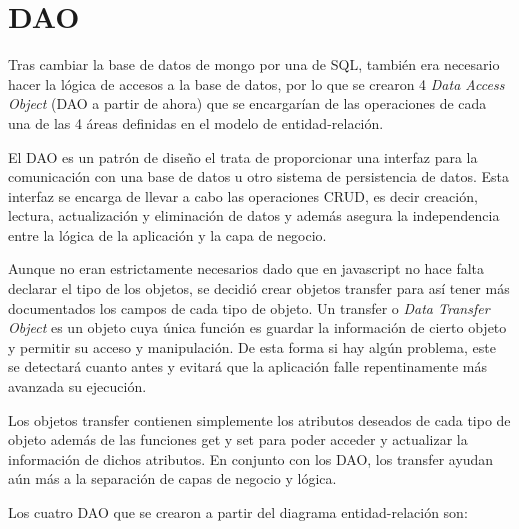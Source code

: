 \documentclass[11pt]{book}
\begin{document}
\chapter{DAO}\label{cap:daos}

Tras cambiar la base de datos de mongo por una de SQL, también era necesario hacer la lógica de accesos a la base de datos, por lo que se crearon 4 \emph{Data Access Object} (DAO a partir de ahora) que se encargarían de las operaciones de cada una de las 4 áreas definidas en el modelo de entidad-relación.

El DAO es un patrón de diseño el trata de proporcionar una interfaz para la comunicación con una base de datos u otro sistema de persistencia de datos. Esta interfaz se encarga de llevar a cabo las operaciones CRUD, es decir creación, lectura, actualización y eliminación de datos y además asegura la independencia entre la lógica de la aplicación y la capa de negocio.

Aunque no eran estrictamente necesarios dado que en javascript no hace falta declarar el tipo de los objetos, se decidió crear objetos transfer para así tener más documentados los campos de cada tipo de objeto.
Un transfer o \emph{Data Transfer Object} es un objeto cuya única función es guardar la información de cierto objeto y permitir su acceso y manipulación.
De esta forma si hay algún problema, este se detectará cuanto antes y evitará que la aplicación falle repentinamente más avanzada su ejecución.

Los objetos transfer contienen simplemente los atributos deseados de cada tipo de objeto además de las funciones get y set para poder acceder y actualizar la información de dichos atributos.
En conjunto con los DAO, los transfer ayudan aún más a la separación de capas de negocio y lógica.

Los cuatro DAO que se crearon a partir del diagrama entidad-relación son:
\end{document}
